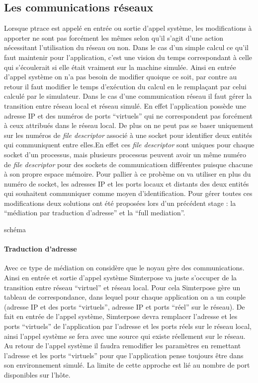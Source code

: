 \subsection{Les communications réseaux}
Lorsque ptrace est appelé en entrée ou sortie d'appel système, les modifications
à apporter ne sont pas forcément les mêmes selon qu'il s'agit d'une action
nécessitant l'utilisation du réseau ou non. Dans le cas d'un simple calcul ce
qu'il faut maintenir pour l'application, c'est une vision du temps correspondant
à celle qui s'écoulerait si elle était vraiment sur la machine simulée. Ainsi en
entrée d'appel système on n'a pas besoin de modifier quoique ce soit, par contre
au retour il faut modifier le temps d'exécution du calcul en le remplaçant par
celui calculé par le simulateur. Dans le cas d'une communication réseau il faut
gérer la transition entre réseau local et réseau simulé. En effet l'application
possède une adresse IP et des numéros de ports ``virtuels'' qui ne correspondent
pas forcément à ceux attribués dans le réseau local. De plus on ne peut pas se
baser uniquement sur les numéros de \textit{file descriptor} associé à une
socket pour identifier deux entités qui communiquent entre elles.En effet ces
\textit{file descriptor} sont uniques pour chaque socket d'un processus, mais
plusieurs processus peuvent avoir un même numéro de \textit{file descriptor}
pour des sockets de communicatiosn différentes puisque chacune à son propre
espace mémoire. Pour pallier à ce probème on va utiliser en plus du numéro de
socket, les adresses IP et les ports locaux et distants des deux entités qui
souhaitent communiquer comme moyen d'identification. Pour gérer toutes ces
modifications deux solutions ont été proposées lors d'un précédent stage \cite{GUILLAUME:interception_syscall}: la
``médiation par traduction d'adresse'' et la ``full mediation''.

{\color{red}schéma}
\paragraph{Traduction d'adresse}
 Avec ce type de médiation on considère que le noyau gère des
 communications. Ainsi en entrée et sortie d'appel système Simterpose va juste
 s'occuper de la transition entre réseau ``virtuel'' et réseau local. Pour cela
 Simterpose gère un tableau de correspondance, dans lequel pour chaque
 application on a un couple (adresse IP et des ports ``virtuels'', adresse IP et
 ports ``réel'' sur le réseau).  De fait en entrée de l'appel système,
 Simterpose devra remplacer l'adresse et les ports ``virtuels'' de l'application
 par l'adresse et les ports réels sur le réseau local, ainsi l'appel système se
 fera avec une source qui existe réellement sur le réseau. Au retour de l'appel
 système il faudra remodifier les paramètres en remettant l'adresse et les ports
 ``virtuels'' pour que l'application pense toujours être dans son environnement
 simulé.  La limite de cette approche est lié au nombre de port disponibles sur
 l'hôte. 

